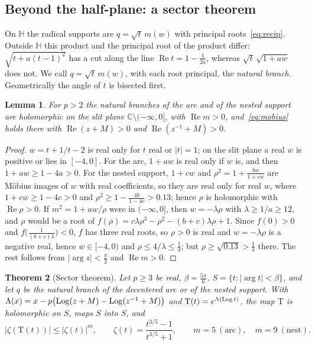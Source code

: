 \documentclass[10pt,a4paper]{article}
\theoremstyle{plain}
\newtheorem{theorem}{Theorem}[section]
\newtheorem{lemma}[theorem]{Lemma}
\theoremstyle{remark}
\numberwithin{equation}{section}
\newcommand{\C}{\mathbb{C}}\newcommand{\R}{\mathbb{R}}\newcommand{\Hp}{\mathbb{H}}
\newcommand{\Tm}{\mathrm{T}}
\DeclareMathOperator{\re}{Re}\DeclareMathOperator{\im}{Im}
\begin{document}
\subsection{Beyond the half-plane: a sector theorem}\label{sec:sector}

On $\Hp$ the radical supports are $q=\sqrt t\,m(w)$ with principal roots~\eqref{eq:recip}. Outside
$\Hp$ this product and the principal root of the product differ: $\sqrt{t+a(t-1)^{2}}$ has a cut
along the line $\re t=1-\frac1{2a}$, whereas $\sqrt t\,\sqrt{1+aw}$ does not. We call
$q=\sqrt t\,m(w)$, with each root principal, the \emph{natural branch}. Geometrically the angle of
$t$ is bisected first.

\begin{lemma}\label{lem:natural}
For $p>2$ the natural branches of the arc and of the nested support are holomorphic on the slit
plane $\C\setminus(-\infty,0]$, with $\re m>0$, and~\eqref{eq:mobius} holds there with
$\re(z+M)>0$ and $\re(z^{-1}+M)>0$.
\end{lemma}

\begin{proof}
$w=t+1/t-2$ is real only for $t$ real or $|t|=1$; on the slit plane a real $w$ is positive or lies
in $[-4,0]$. For the arc, $1+aw$ is real only if $w$ is, and then $1+aw\ge1-4a>0$. For the nested
support, $1+cw$ and $\rho^{2}=1+\frac{bw}{1+cw}$ are M\"obius images of $w$ with real coefficients,
so they are real only for real $w$, where $1+cw\ge1-4c>0$ and $\rho^{2}\ge1-\frac{4b}{1-4c}>0.13$;
hence $\rho$ is holomorphic with $\re\rho>0$. If $m^{2}=1+aw/\rho$ were in $(-\infty,0]$, then
$w=-\lambda\rho$ with $\lambda\ge1/a\ge12$, and $\rho$ would be a root of
$f(\rho)=c\lambda\rho^{3}-\rho^{2}-(b+c)\lambda\rho+1$. Since $f(0)>0$ and
$f\bigl(\frac1{(b+c)\lambda}\bigr)<0$, $f$ has three real roots, so $\rho>0$ is real and
$w=-\lambda\rho$ is a negative real, hence $w\in[-4,0)$ and $\rho\le4/\lambda\le\frac13$; but
$\rho\ge\sqrt{0.13}>\frac13$ there. The rest follows from $|\arg z|<\frac\pi2$ and $\re m>0$.
\end{proof}

\begin{theorem}[Sector theorem]\label{thm:sector}
Let $p\ge3$ be real, $\beta=\frac{5\pi}6$, $S=\{t:|\arg t|<\beta\}$, and let $q$ be the natural
branch of the decentered arc or of the nested support. With
$\Lambda(x)=x-p\bigl(\operatorname{Log}(z+M)-\operatorname{Log}(z^{-1}+M)\bigr)$ and $\Tm(t)=e^{\Lambda(\Log t)}$, the map $\Tm$
is holomorphic on $S$, maps $S$ into $S$, and
\[
  |\zeta(\Tm(t))|\le|\zeta(t)|^{m},\qquad \zeta(t)=\frac{t^{3/5}-1}{t^{3/5}+1},\qquad m=5\ (\mathrm{arc}),\quad
  m=9\ (\mathrm{nest}).
\]
\end{theorem}
\end{document}
